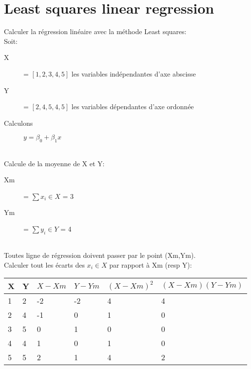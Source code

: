 
\pagebreak
\section{Least squares linear regression}
Calculer la régression linéaire avec la méthode Least squares:\\
Soit:
\begin{description}
\item[X] = $[1,2,3,4,5]$ les variables indépendantes d'axe abscisse
\item[Y] = $[2,4,5,4,5]$ les variables dépendantes d'axe ordonnée
\item[Calculons] $y = \beta_0 + \beta_1 x$
\end{description}
\ \\
Calcule de la moyenne de X et Y:
\begin{description}
\item[Xm] = $ \sum x_i \in X$ = 3
\item[Ym] = $ \sum y_i \in Y$ = 4
\end{description}
\ \\
Toutes ligne de régression doivent passer par le point (Xm,Ym).\\
Calculer tout les écarts des $x_i \in X$ par rapport à Xm (resp Y):\\

\begin{tabular}{ll|l|l|l|l}
  \hline
  X  & Y & $X - Xm$ & $Y - Ym$ & $(X-Xm)^2$ & $(X-Xm)(Y-Ym)$\\
  \hline
  1 & 2 & -2 & -2 & 4 & 4\\
  2 & 4 & -1 & 0  & 1 & 0\\
  3 & 5 & 0  & 1  & 0 & 0\\
  4 & 4 & 1  & 0  & 1 & 0\\
  5 & 5 & 2  & 1  & 4 & 2\\ 
  \hline
\end{tabular}


